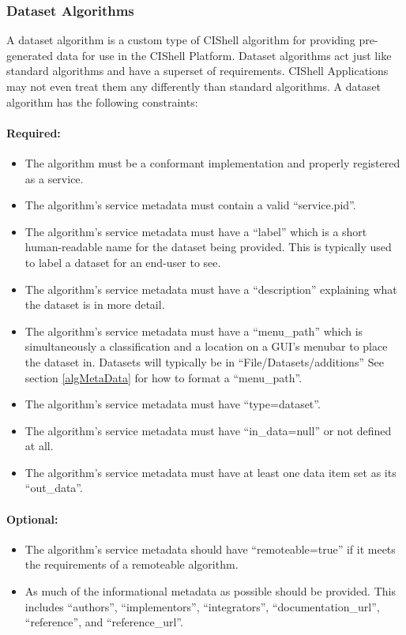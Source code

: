 \subsubsection{Dataset Algorithms}

A dataset algorithm is a custom type of CIShell algorithm for providing
pre-generated data for use in the CIShell Platform. Dataset algorithms act just
like standard algorithms and have a superset of requirements. CIShell
Applications may not even treat them any differently than standard algorithms. A
dataset algorithm has the following constraints:

\paragraph*{Required:}
\begin{itemize}
  \item The algorithm must be a conformant 
  implementation and properly registered as a service.
  \item The algorithm's service metadata must contain a valid ``service.pid''.
  \item The algorithm's service metadata must have a ``label'' which is a
  short human-readable name for the dataset being provided. This is typically
  used to label a dataset for an end-user to see.
  \item The algorithm's service metadata must have a ``description''
  explaining what the dataset is in more detail.
  \item The algorithm's service metadata must have a ``menu\_path'' which is
  simultaneously a classification and a location on a GUI's menubar to place
  the dataset in. Datasets will typically be in ``File/Datasets/additions''
  See section \ref{algMetaData} for how to format a ``menu\_path''.
  \item The algorithm's service metadata must have ``type=dataset''.
  \item The algorithm's service metadata must have ``in\_data=null'' or
  not defined at all.
  \item The algorithm's service metadata must have at least one data item set
  as its ``out\_data''.
\end{itemize}

\paragraph*{Optional:}
\begin{itemize}
  \item The algorithm's service metadata should have ``remoteable=true'' if it
  meets the requirements of a remoteable algorithm.
  \item As much of the informational metadata as possible should be
  provided. This includes ``authors'', ``implementors'', ``integrators'',
  ``documentation\_url'', ``reference'', and ``reference\_url''.
\end{itemize}

